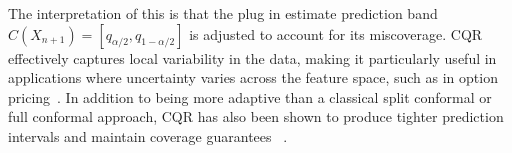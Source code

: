 \documentclass{article}
\theoremstyle{definition}
\begin{document}
The interpretation of this is that the plug in estimate prediction band $C(X_{n+1}) = [q_{\alpha/2}, q_{1-\alpha/2}]$ is adjusted to account for its miscoverage. CQR effectively captures local variability in the data, making it particularly useful in applications where uncertainty varies across the feature space, such as in option pricing~\cite{bastos}. In addition to being more adaptive than a classical split conformal or full conformal approach, CQR has also been shown to produce tighter prediction intervals and maintain coverage guarantees ~\cite{cqr}.

\end{document}
